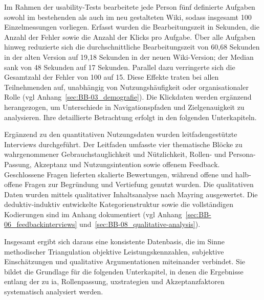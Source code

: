 Im Rahmen der \Gls{usability}-Tests bearbeitete jede Person fünf definierte Aufgaben sowohl im bestehenden als auch im neu gestalteten Wiki, sodass insgesamt 100 Einzelmessungen vorliegen. Erfasst wurden die Bearbeitungszeit in Sekunden, die Anzahl der Fehler sowie die Anzahl der Klicks pro Aufgabe. Über alle Aufgaben hinweg reduzierte sich die durchschnittliche Bearbeitungszeit von 60{,}68 Sekunden in der alten Version auf 19{,}18 Sekunden in der neuen Wiki-Version; der Median sank von 48 Sekunden auf 17 Sekunden. Parallel dazu verringerte sich die Gesamtzahl der Fehler von 100 auf 15. Diese Effekte traten bei allen Teilnehmenden auf, unabhängig von Nutzungshäufigkeit oder organisationaler Rolle (\acrshort{vgl} Anhang~\ref{sec:BB-03_demografie}). Die Klickdaten werden ergänzend herangezogen, um Unterschiede in Navigationspfaden und Zielgenauigkeit zu analysieren. Ihre detaillierte Betrachtung erfolgt in den folgenden Unterkapiteln.

Ergänzend zu den quantitativen Nutzungsdaten wurden leitfadengestützte Interviews durchgeführt. Der Leitfaden umfasste vier thematische Blöcke zu wahrgenommener Gebrauchstauglichkeit und Nützlichkeit, Rollen- und Persona-Passung, Akzeptanz und Nutzungsintention sowie offenem Feedback. Geschlossene Fragen lieferten skalierte Bewertungen, während offene und halb-offene Fragen zur Begründung und Vertiefung genutzt wurden. Die qualitativen Daten wurden mittels qualitativer Inhaltsanalyse nach Mayring ausgewertet. Die deduktiv-induktiv entwickelte Kategorienstruktur sowie die vollständigen Kodierungen sind im Anhang dokumentiert (\acrshort{vgl} Anhang~\ref{sec:BB-06_feedbackinterviews} und~\ref{sec:BB-08_qualitative-analysis}).

Insgesamt ergibt sich daraus eine konsistente Datenbasis, die im Sinne methodischer Triangulation objektive Leistungskennzahlen, subjektive Einschätzungen und qualitative Argumentationen miteinander verbindet. Sie bildet die Grundlage für die folgenden Unterkapitel, in denen die Ergebnisse entlang der  zu \Gls{ia}, Rollenpassung, \Gls{uxstrategien} und Akzeptanzfaktoren systematisch analysiert werden.
